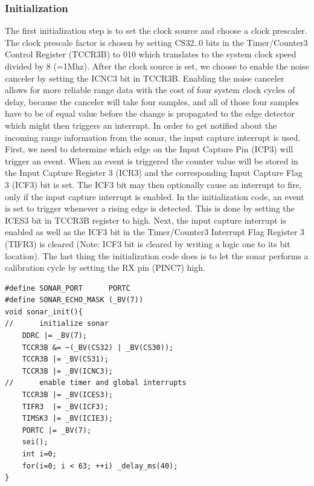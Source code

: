 \subsubsection{Initialization}
The first initialization step is to set the clock source and choose a clock prescaler. The clock prescale factor is chosen by setting CS32..0 bits in the Timer/Counter3 Control Register (TCCR3B) to 010 which translates to the system clock speed divided by 8 (=1Mhz). After the clock source is set, we choose to enable the noise canceler by setting the ICNC3 bit in TCCR3B. Enabling the noise canceler allows for more reliable range data with the cost of four system clock cycles of delay, because the canceler will take four samples, and all of those four samples have to be of equal value before the change is propagated to the edge detector which might then triggers an interrupt. In order to get notified about the incoming range information from the sonar, the input capture interrupt is used. First, we need to determine which edge on the Input Capture Pin (ICP3) will trigger an event. When an event is triggered the counter value will be stored in the Input Capture Register 3 (ICR3) and the corresponding Input Capture Flag 3 (ICF3) bit is set. The ICF3 bit may then optionally cause an interrupt to fire, only if the input capture interrupt is enabled. In the initialization code, an event is set to trigger whenever a rising edge is detected. This is done by setting the ICES3 bit in TCCR3B register to high. Next, the input capture interrupt is enabled as well as the ICF3 bit in the Timer/Counter3 Interrupt Flag Register 3 (TIFR3) is cleared (Note: ICF3 bit is cleared by writing a logic one to its bit location). The last thing the initialization code does is to let the sonar performs a calibration cycle by setting the RX pin (PINC7) high.

\begin{lstlisting}
#define SONAR_PORT      PORTC
#define SONAR_ECHO_MASK (_BV(7))                                        
void sonar_init(){
//      initialize sonar
	DDRC |= _BV(7);                       
    TCCR3B &= ~(_BV(CS32) | _BV(CS30));     
    TCCR3B |= _BV(CS31);                            
    TCCR3B |= _BV(ICNC3);                           
//      enable timer and global interrupts
    TCCR3B |= _BV(ICES3);
    TIFR3  |= _BV(ICF3);
    TIMSK3 |= _BV(ICIE3);
    PORTC |= _BV(7);
    sei();
	int i=0;
    for(i=0; i < 63; ++i) _delay_ms(40);
}
\end{lstlisting}

